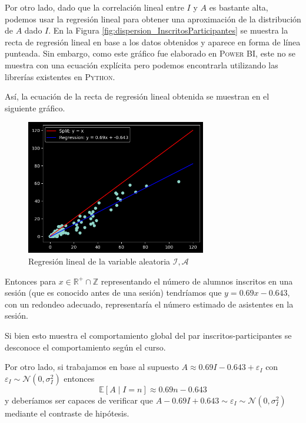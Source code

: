 \documentclass[11pt,a4paper]{book}
\theoremstyle{definition}%
\newcommand{\Real}{\mathbb{R}}
\newcommand{\Integer}{\mathbb{Z}}
\newcommand{\EV}[1]{\mathbb{E}\left[#1\right]}
\begin{document}
                Por otro lado, dado que la correlación lineal entre $I$ y $A$ es bastante alta, podemos usar la regresión lineal para obtener una aproximación de la distribución de $A$ dado $I$. En la Figura \ref{fig:dispersion_InscritosParticipantes} se muestra la recta de regresión lineal en base a los datos obtenidos y aparece en forma de línea punteada. Sin embargo, como este gráfico fue elaborado en \textsc{Power BI}, este no se muestra con una ecuación explícita pero podemos encontrarla utilizando las librerías existentes en \textsc{Python}.

                Así, la ecuación de la recta de regresión lineal obtenida se muestran en el siguiente gráfico.
                \begin{figure}[H]
                    \centering
                    \includegraphics[width=0.7\textwidth]{Sources/linearregression_InscritosParticipantes.png}
                    \caption{Regresión lineal de la variable aleatoria $\mathcal{I},\mathcal{A}$}
                \end{figure}
                Entonces para $x\in\Real^+\cap\Integer$ representando el número de alumnos inscritos en una sesión (que es conocido antes de una sesión) tendríamos que $y=0.69x-0.643$, con un redondeo adecuado, representaría el número estimado de asistentes en la sesión.

                Si bien esto muestra el comportamiento global del par inscritos-participantes se desconoce el comportamiento según el curso.

                Por otro lado, si trabajamos en base al supuesto $A\approx0.69I-0.643+\varepsilon_I$ con $\varepsilon_I\sim\mathcal{N}(0,\sigma_I^2)$ entonces
                \begin{equation*}
                    \EV{A\mid I=n}\approx 0.69n-0.643
                \end{equation*}
                y deberíamos ser capaces de verificar que $A-0.69I+0.643\sim\varepsilon_I\sim\mathcal{N}(0,\sigma_I^2)$ mediante el contraste de hipótesis.
\end{document}
